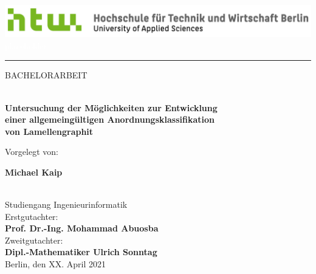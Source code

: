 \documentclass[
fontsize=10pt, 
listof = totoc,
parskip = half	
]{report}
\author{Michael Kaip}
\date{}
\begin{document}
\begin{titlepage}
	\vspace*{-\headsep}\vspace{-\headheight}
	\noindent
	\includegraphics[scale=0.38]{logo}
	\hfill
	\textcolor{white}{placeholder}\\[-1ex]
	\rule{\linewidth}{1pt}
	
	\vfill\vfill
	
	\begin{center}
		BACHELORARBEIT
		\begin{huge}
			\\[2ex]
			\textbf{Untersuchung der Möglichkeiten zur Entwicklung \\ einer allgemeingültigen Anordnungsklassifikation \\ von Lamellengraphit}
			\\[6ex]
		\end{huge}
		Vorgelegt von:
		\\[2ex]
		\begin{huge}
			\textbf{Michael Kaip}
		\end{huge}
		\\[2ex]
		Studiengang Ingenieurinformatik
		\\[28ex]
		Erstgutachter:
		\\[2ex]
		\textbf{Prof. Dr.-Ing. Mohammad Abuosba}
		\\[4ex]
		Zweitgutachter:
		\\[2ex]
		\textbf{Dipl.-Mathematiker Ulrich Sonntag}
		\\[40ex]
		Berlin, den XX. April 2021
	\end{center}
\end{titlepage}
	
\clearpage

\begingroup
\pagestyle{empty}
\null
\newpage
\endgroup


\begin{abstract}
	\lipsum[1-4]   
\end{abstract}

\newpage
\tableofcontents
\newpage
{}
\listoffigures
{}
\newpage
\listoftables
{}
\newpage
{}
\newpage
\end{document}
